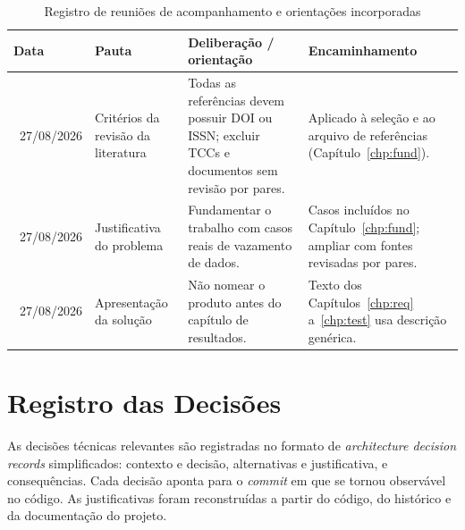 \begin{table}[htb]
\centering
\caption{Registro de reuniões de acompanhamento e orientações incorporadas}\label{tab:reunioes}
\small
\begin{tabular}{|p{1.8cm}|p{3.3cm}|p{5.2cm}|p{3.6cm}|}
\hline
\textbf{Data} & \textbf{Pauta} & \textbf{Deliberação / orientação} & \textbf{Encaminhamento} \\ \hline
\ 27/08/2026 & Critérios da revisão da literatura & Todas as referências devem possuir DOI ou ISSN; excluir TCCs e documentos sem revisão por pares. & Aplicado à seleção e ao arquivo de referências (Capítulo~\ref{chp:fund}). \\ \hline
\ 27/08/2026 & Justificativa do problema & Fundamentar o trabalho com casos reais de vazamento de dados. & Casos incluídos no Capítulo~\ref{chp:fund}; ampliar com fontes revisadas por pares. \\ \hline
\ 27/08/2026 & Apresentação da solução & Não nomear o produto antes do capítulo de resultados. & Texto dos Capítulos~\ref{chp:req} a~\ref{chp:test} usa descrição genérica. \\ \hline

\end{tabular}
\end{table}


\section{Registro das Decisões}
\label{sec:dev_decisoes}

As decisões técnicas relevantes são registradas no formato de \textit{architecture decision records} simplificados: contexto e decisão, alternativas e justificativa, e consequências. Cada decisão aponta para o \textit{commit} em que se tornou observável no código. As justificativas foram reconstruídas a partir do código, do histórico e da documentação do projeto.



